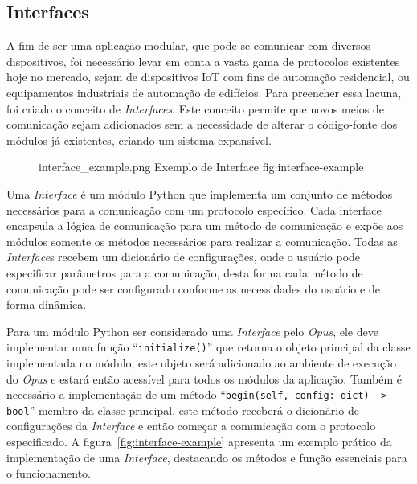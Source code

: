 \subsection{Interfaces}
\label{opus-sec:interfaces}

A fim de ser uma aplicação modular, que pode se comunicar com diversos dispositivos, foi necessário levar em conta a vasta 
gama de protocolos existentes hoje no mercado, sejam de dispositivos IoT com fins de automação residencial, ou equipamentos industriais
de automação de edifícios. Para preencher essa lacuna, foi criado o conceito de \emph{Interfaces}. Este conceito permite que novos meios de
comunicação sejam adicionados sem a necessidade de alterar o código-fonte dos módulos já existentes, criando um sistema expansível.
\begin{figure}[h!]
    {interface_example.png}
    {Exemplo de Interface}
    {fig:interface-example}
\end{figure}

Uma \emph{Interface} é um módulo Python que implementa um conjunto de métodos necessários para a comunicação com um protocolo específico. Cada interface
encapsula a lógica de comunicação para um método de comunicação e expõe aos módulos somente os métodos necessários para realizar a comunicação.
Todas as \emph{Interface}s recebem um dicionário de configurações, onde o usuário pode especificar parâmetros para a comunicação, desta forma
cada método de comunicação pode ser configurado conforme as necessidades do usuário e de forma dinâmica.

Para um módulo Python ser considerado uma \emph{Interface} pelo \emph{Opus}, ele deve implementar uma função ``\lstinline{initialize()}'' que retorna o objeto 
principal da classe implementada no módulo, este objeto será adicionado ao ambiente de execução do \emph{Opus} e estará então acessível para todos os módulos 
da aplicação. Também é necessário a implementação de um método ``\lstinline{begin(self, config: dict) -> bool}'' membro da classe principal, este método 
receberá o dicionário de configurações da \emph{Interface} e então começar a comunicação com o protocolo especificado. 
A figura~\ref{fig:interface-example} apresenta um exemplo prático da implementação de uma \emph{Interface}, destacando os métodos e função 
essenciais para o funcionamento.

